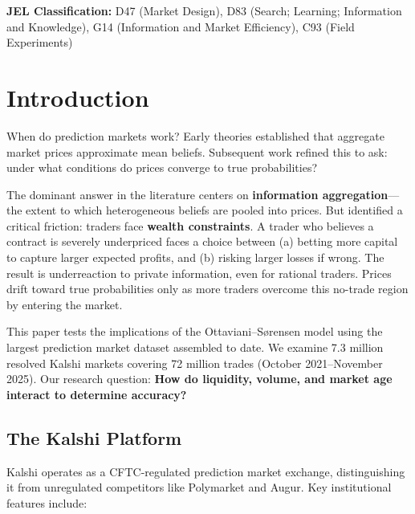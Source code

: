 \documentclass[12pt,letterpaper]{article}
\begin{document}
\vspace{0.2cm}
\noindent \textbf{JEL Classification:} D47 (Market Design), D83 (Search; Learning; Information and Knowledge), G14 (Information and Market Efficiency), C93 (Field Experiments)

\clearpage

\tableofcontents
\clearpage

\section{Introduction}\label{sec:introduction}

When do prediction markets work? Early theories \citep{wolfers2004prediction, wolfers2006interpreting} established that aggregate market prices approximate mean beliefs. Subsequent work \citep{ottaviani2007outcomes, ottaviani2010noise, page2013wisdom} refined this to ask: under what conditions do prices converge to true probabilities?

The dominant answer in the literature centers on \textbf{information aggregation}---the extent to which heterogeneous beliefs are pooled into prices. But \citet{ottaviani2007outcomes} identified a critical friction: traders face \textbf{wealth constraints}. A trader who believes a contract is severely underpriced faces a choice between (a) betting more capital to capture larger expected profits, and (b) risking larger losses if wrong. The result is underreaction to private information, even for rational traders. Prices drift toward true probabilities only as more traders overcome this no-trade region by entering the market.

This paper tests the implications of the Ottaviani--S{\o}rensen model using the largest prediction market dataset assembled to date. We examine 7.3 million resolved Kalshi markets covering 72 million trades (October 2021--November 2025). Our research question: \textbf{How do liquidity, volume, and market age interact to determine accuracy?}

\subsection{The Kalshi Platform}

Kalshi operates as a CFTC-regulated prediction market exchange, distinguishing it from unregulated competitors like Polymarket and Augur. Key institutional features include:
\end{document}
